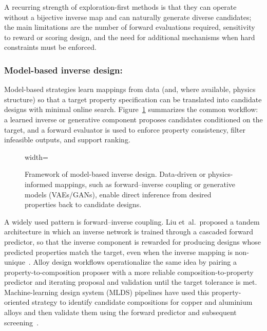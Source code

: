A recurring strength of exploration-first methods is that they can operate without a bijective inverse map and can naturally generate diverse candidates; the main limitations are the number of forward evaluations required, sensitivity to reward or scoring design, and the need for additional mechanisms when hard constraints must be enforced.


\subsubsection{Model-based inverse design:}

Model-based strategies learn mappings from data (and, where available, physics structure) so that a target property specification can be translated into candidate designs with minimal online search. Figure~\ref{fig:model_based_inverse} summarizes the common workflow: a learned inverse or generative component proposes candidates conditioned on the target, and a forward evaluator is used to enforce property consistency, filter infeasible outputs, and support ranking.

\begin{figure}[!htbp]
  \centering
  \begin{adjustbox}{width=\linewidth}
      
  \end{adjustbox}
  \caption[Model-Based Inverse Design Framework]{Framework of model-based inverse design. Data-driven or physics-informed mappings, such as forward–inverse coupling or generative models (VAEs/GANs), enable direct inference from desired properties back to candidate designs.}
  \label{fig:model_based_inverse}
\end{figure}



A widely used pattern is forward--inverse coupling. Liu et~al.\ proposed a tandem architecture in which an inverse network is trained through a cascaded forward predictor, so that the inverse component is rewarded for producing designs whose predicted properties match the target, even when the inverse mapping is non-unique~\cite{Liu2018_ACSPhotonics}. Alloy design workflows operationalize the same idea by pairing a property-to-composition proposer with a more reliable composition-to-property predictor and iterating proposal and validation until the target tolerance is met. Machine-learning design system (MLDS) pipelines have used this property-oriented strategy to identify candidate compositions for copper and aluminium alloys and then validate them using the forward predictor and subsequent screening~\cite{Wang2019_NPJCM,Jiang2022_JMST}.

